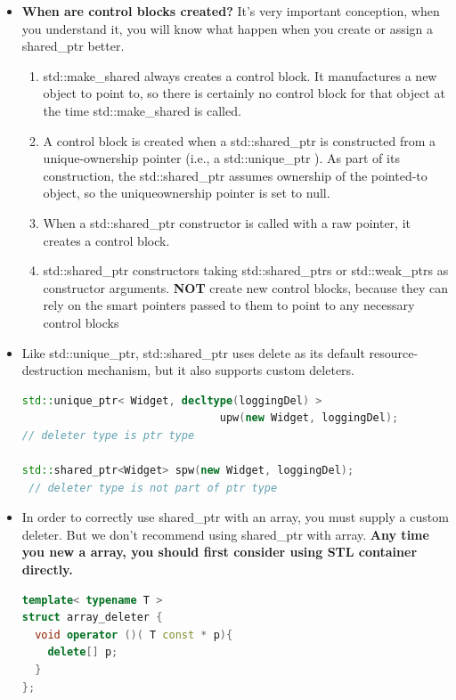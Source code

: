 \documentclass[a4paper,12pt,twoside]{book}
\begin{document}
\begin{itemize}
\item \textbf{When are control blocks created?}  It's very important conception, when you understand it, you will know what happen when you create or assign a shared\_ptr better. 
		
\begin{enumerate}
\item std::make\_shared  always creates a control block. It manufactures
a new object to point to, so there is certainly no control block for that
object at the time std::make\_shared is called.

\item A control block is created when a std::shared\_ptr is constructed from a
unique-ownership pointer (i.e., a std::unique\_ptr ). As part of its construction, the std::shared\_ptr assumes ownership of the pointed-to object, so the uniqueownership pointer is set to null.

\item When a std::shared\_ptr constructor is called with a raw pointer, it creates a control block.

\item std::shared\_ptr constructors taking std::shared\_ptrs or std::weak\_ptrs as constructor arguments. \textbf{NOT} create new control blocks, because they can rely on the smart pointers passed to them to point to any necessary control blocks

\end{enumerate}


\item Like std::unique\_ptr, std::shared\_ptr uses delete as its default resource-destruction mechanism, but it also supports custom deleters.
\begin{lstlisting}[frame=single, language=c++]
std::unique_ptr< Widget, decltype(loggingDel) >
                               upw(new Widget, loggingDel);
// deleter type is ptr type

std::shared_ptr<Widget> spw(new Widget, loggingDel);
 // deleter type is not part of ptr type
\end{lstlisting}

\item In order to correctly use shared\_ptr with an array, you must supply a custom deleter. But we don't recommend using shared\_ptr with array. \textbf{Any time you new a array, you should first consider using STL container directly.}
\begin{lstlisting}[frame=single, language=c++]
template< typename T >
struct array_deleter {
  void operator ()( T const * p){
    delete[] p;
  }
};


\end{lstlisting}
\end{itemize}
\end{document}
